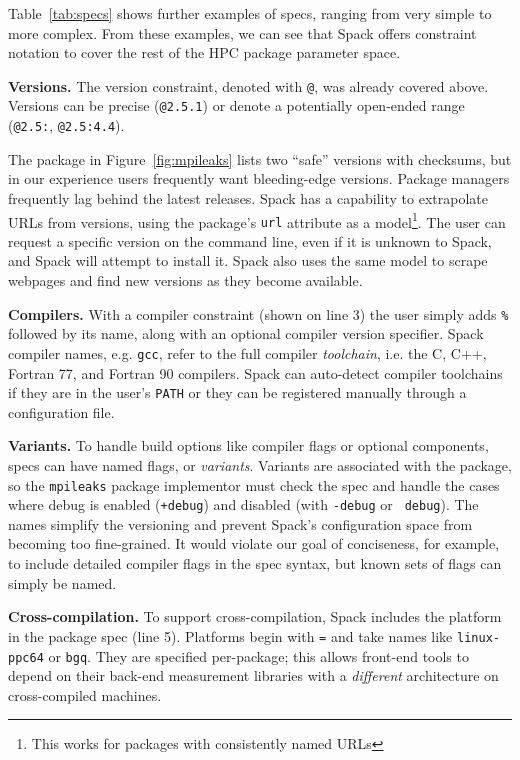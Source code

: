 Table~\ref{tab:specs} shows further examples of specs, ranging from very
simple to more complex. From these examples, we can see that Spack offers constraint
notation to cover the rest of the HPC package parameter space.

{\bf Versions.}
The version constraint, denoted with {\tt @}, was already covered above. Versions
can be precise ({\tt @2.5.1}) or denote a potentially open-ended 
range ({\tt @2.5:}, {\tt @2.5:4.4}).

The package in Figure~\ref{fig:mpileaks} lists two ``safe'' versions with checksums, but
in our experience users frequently want bleeding-edge versions.  Package managers
frequently lag behind the latest releases. 
Spack has a capability to extrapolate URLs from versions,
using the package's {\tt url} attribute as a model\footnote{This works
for packages with consistently named URLs}.  The user can request a specific
version on the command line, even if it is unknown to Spack,
and Spack will attempt to install it.  Spack also uses the same
model to scrape webpages and find new versions as they become available.

{\bf Compilers.}
With a compiler constraint (shown on line 3) the user
simply adds {\tt \%} followed by its name, along with an optional compiler version 
specifier.  Spack compiler names, e.g. {\tt gcc}, refer to the full compiler {\it toolchain},
i.e. the C, C++, Fortran 77, and Fortran 90 compilers.  Spack can auto-detect
compiler toolchains if they are in the user's {\tt PATH} or they can be registered manually
through a configuration file.

{\bf Variants.}
To handle build options like compiler flags or optional components, specs can
have named flags, or {\it variants}.  Variants are associated with the package,
so the {\tt mpileaks} package implementor must check the spec and handle the cases
where debug is enabled ({\tt +debug}) and disabled (with {\tt -debug}
or {\tt ~debug}).  The names simplify the versioning and prevent
Spack's configuration space from becoming too fine-grained.
It would violate our goal of conciseness, for example, to include detailed 
compiler flags in the spec syntax, but known sets of flags can simply be named.

{\bf Cross-compilation.}
To support cross-compilation, Spack includes the platform in the package spec (line 5).
Platforms begin with {\tt =} and take names like {\tt linux-ppc64} or {\tt bgq}.  They are
specified per-package; this allows front-end tools to depend on their back-end measurement
libraries with a {\it different} architecture on cross-compiled machines.

